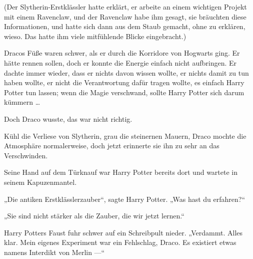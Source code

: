 (Der Slytherin-Erstklässler hatte erklärt, er arbeite an einem wichtigen Projekt mit einem Ravenclaw, und der Ravenclaw habe ihm gesagt, sie bräuchten diese Informationen, und hatte sich dann aus dem Staub gemacht, ohne zu erklären, wieso. Das hatte ihm viele mitfühlende Blicke eingebracht.)

Dracos Füße waren schwer, als er durch die Korridore von Hogwarts ging. Er hätte rennen sollen, doch er konnte die Energie einfach nicht aufbringen. Er dachte immer wieder, dass er nichts davon wissen wollte, er nichts damit zu tun haben wollte, er nicht die Verantwortung dafür tragen wollte, es einfach Harry Potter tun lassen; wenn die Magie verschwand, sollte Harry Potter sich darum kümmern …

Doch Draco wusste, das war nicht richtig.

Kühl die Verliese von Slytherin, grau die steinernen Mauern, Draco mochte die Atmosphäre normalerweise, doch jetzt erinnerte sie ihn zu sehr an das Verschwinden.

Seine Hand auf dem Türknauf war Harry Potter bereits dort und wartete in seinem Kapuzenmantel.

„Die antiken Erstklässlerzauber“, sagte Harry Potter.
„Was hast du erfahren?“

„Sie sind nicht stärker als die Zauber, die wir jetzt lernen.“

Harry Potters Faust fuhr schwer auf ein Schreibpult nieder.
„Verdammt. Alles klar. Mein eigenes Experiment war ein Fehlschlag, Draco. Es existiert etwas namens Interdikt von Merlin —“

